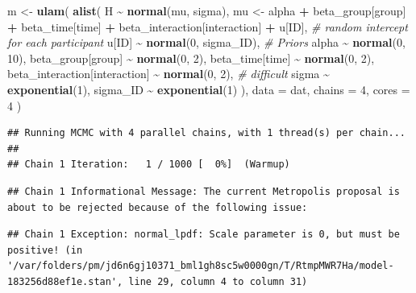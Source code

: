 \documentclass[
]{article}
\newenvironment{Shaded}{\begin{snugshade}}{\end{snugshade}}
\newcommand{\AttributeTok}[1]{\textcolor[rgb]{0.13,0.29,0.53}{#1}}
\newcommand{\CommentTok}[1]{\textcolor[rgb]{0.56,0.35,0.01}{\textit{#1}}}
\newcommand{\DecValTok}[1]{\textcolor[rgb]{0.00,0.00,0.81}{#1}}
\newcommand{\FunctionTok}[1]{\textcolor[rgb]{0.13,0.29,0.53}{\textbf{#1}}}
\newcommand{\NormalTok}[1]{#1}
\newcommand{\OtherTok}[1]{\textcolor[rgb]{0.56,0.35,0.01}{#1}}
\newcommand{\SpecialCharTok}[1]{\textcolor[rgb]{0.81,0.36,0.00}{\textbf{#1}}}
\begin{document}
\begin{Shaded}
\begin{Highlighting}[]
\NormalTok{m }\OtherTok{\textless{}{-}} \FunctionTok{ulam}\NormalTok{(}
  \FunctionTok{alist}\NormalTok{(}
\NormalTok{    H }\SpecialCharTok{\textasciitilde{}} \FunctionTok{normal}\NormalTok{(mu, sigma),}
\NormalTok{    mu }\OtherTok{\textless{}{-}}\NormalTok{ alpha }\SpecialCharTok{+}
\NormalTok{      beta\_group[group] }\SpecialCharTok{+}\NormalTok{ beta\_time[time] }\SpecialCharTok{+}\NormalTok{ beta\_interaction[interaction] }\SpecialCharTok{+}\NormalTok{ u[ID],}
    \CommentTok{\# random intercept for each participant}
\NormalTok{    u[ID] }\SpecialCharTok{\textasciitilde{}} \FunctionTok{normal}\NormalTok{(}\DecValTok{0}\NormalTok{, sigma\_ID),}
    \CommentTok{\# Priors}
\NormalTok{    alpha }\SpecialCharTok{\textasciitilde{}} \FunctionTok{normal}\NormalTok{(}\DecValTok{0}\NormalTok{, }\DecValTok{10}\NormalTok{),}
\NormalTok{    beta\_group[group] }\SpecialCharTok{\textasciitilde{}} \FunctionTok{normal}\NormalTok{(}\DecValTok{0}\NormalTok{, }\DecValTok{2}\NormalTok{),}
\NormalTok{    beta\_time[time] }\SpecialCharTok{\textasciitilde{}} \FunctionTok{normal}\NormalTok{(}\DecValTok{0}\NormalTok{, }\DecValTok{2}\NormalTok{),}
\NormalTok{    beta\_interaction[interaction] }\SpecialCharTok{\textasciitilde{}} \FunctionTok{normal}\NormalTok{(}\DecValTok{0}\NormalTok{, }\DecValTok{2}\NormalTok{), }\CommentTok{\# difficult}
\NormalTok{    sigma }\SpecialCharTok{\textasciitilde{}} \FunctionTok{exponential}\NormalTok{(}\DecValTok{1}\NormalTok{),}
\NormalTok{    sigma\_ID }\SpecialCharTok{\textasciitilde{}} \FunctionTok{exponential}\NormalTok{(}\DecValTok{1}\NormalTok{)}
\NormalTok{  ),}
  \AttributeTok{data =}\NormalTok{ dat,}
  \AttributeTok{chains =} \DecValTok{4}\NormalTok{,}
  \AttributeTok{cores =} \DecValTok{4}
\NormalTok{)}
\end{Highlighting}
\end{Shaded}

\begin{verbatim}
## Running MCMC with 4 parallel chains, with 1 thread(s) per chain...
## 
## Chain 1 Iteration:   1 / 1000 [  0%]  (Warmup)
\end{verbatim}

\begin{verbatim}
## Chain 1 Informational Message: The current Metropolis proposal is about to be rejected because of the following issue:
\end{verbatim}

\begin{verbatim}
## Chain 1 Exception: normal_lpdf: Scale parameter is 0, but must be positive! (in '/var/folders/pm/jd6n6gj10371_bml1gh8sc5w0000gn/T/RtmpMWR7Ha/model-183256d88ef1e.stan', line 29, column 4 to column 31)
\end{verbatim}
\end{document}
